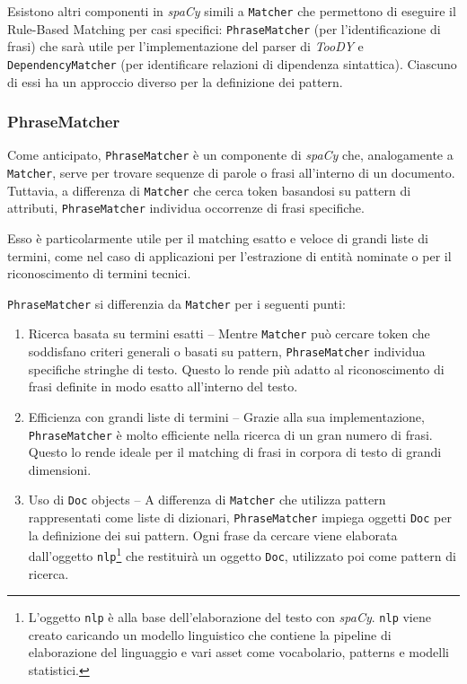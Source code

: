 \documentclass[12pt]{report}
\newcommand{\toody}{\textsl{TooDY}\xspace}
\newcommand{\spacy}{\textsl{spaCy}\xspace}
\begin{document}
Esistono altri componenti in \spacy simili a \texttt{Matcher} che permettono di eseguire il Rule-Based Matching per casi specifici: \texttt{PhraseMatcher} (per l'identificazione di frasi) che sarà utile per l'implementazione del parser di \toody e \texttt{DependencyMatcher} (per identificare relazioni di dipendenza sintattica). Ciascuno di essi ha un approccio diverso per la definizione dei pattern.


\subsubsection{PhraseMatcher}
Come anticipato, \texttt{PhraseMatcher} è un componente di \spacy che, analogamente a \texttt{Matcher}, serve per trovare sequenze di parole o frasi all'interno di un documento. Tuttavia, a differenza di \texttt{Matcher} che cerca token basandosi su pattern di attributi, \texttt{PhraseMatcher} individua occorrenze di frasi specifiche.

Esso è particolarmente utile per il matching esatto e veloce di grandi liste di termini, come nel caso di applicazioni per l'estrazione di entità nominate o per il riconoscimento di termini tecnici.

\texttt{PhraseMatcher} si differenzia da \texttt{Matcher} per i seguenti punti:

\begin{enumerate}
\item \textsf{Ricerca basata su termini esatti} -- Mentre \texttt{Matcher} può cercare token che soddisfano criteri generali o basati su pattern, \texttt{PhraseMatcher} individua specifiche stringhe di testo. Questo lo rende più adatto al riconoscimento di frasi definite in modo esatto all'interno del testo.
\item \textsf{Efficienza con grandi liste di termini} -- Grazie alla sua implementazione, \texttt{PhraseMatcher} è molto efficiente nella ricerca di un gran numero di frasi. Questo lo rende ideale per il matching di frasi in corpora di testo di grandi dimensioni.
\item \textsf{Uso di \texttt{Doc} objects} -- A differenza di \texttt{Matcher} che utilizza pattern rappresentati come liste di dizionari, \texttt{PhraseMatcher} impiega oggetti \texttt{Doc} per la definizione dei sui pattern. Ogni frase da cercare viene elaborata dall'oggetto \texttt{nlp}\footnote{L'oggetto \texttt{nlp} è alla base dell'elaborazione del testo con \spacy. \texttt{nlp} viene creato caricando un modello linguistico che contiene la pipeline di elaborazione del linguaggio e vari asset come vocabolario, patterns e modelli statistici.} che restituirà un oggetto \texttt{Doc}, utilizzato poi come pattern di ricerca.
\end{enumerate}
\end{document}
